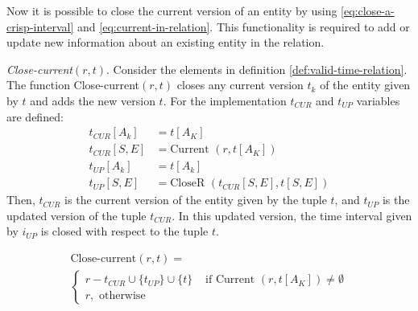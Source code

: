 Now it is possible to close the current version of an entity by using \eqref{eq:close-a-crisp-interval} and \eqref{eq:current-in-relation}. This functionality is required to add or update new information about an existing entity in the relation.

\begin{definition}
\label{def:close-current-version}
\emph{Close-current$\left(r, t\right)$}.
Consider the elements in definition \ref{def:valid-time-relation}. The function Close-current$\left(r, t \right)$ closes any current version $t_k$ of the entity given by $t$ and adds the new version $t$. For the implementation $t_{CUR}$ and $t_{UP}$ variables are defined:
\begin{align}
 \label{eq:variables-current-version}
t_{CUR}\left[A_k\right] &= t[A_K]\\\nonumber
t_{CUR}\left[S,E \right] &= \mbox{Current } \left(r, t[A_K] \right)\\\nonumber
t_{UP}[A_k] &= t[A_k]\\
 t_{UP}\left[S,E \right] &= \mbox{CloseR }\left(t_{CUR}\left[S,E \right], t[S,E] \right)\nonumber
\end{align}
Then, $t_{CUR}$ is the current version of the entity given by the tuple $t$, and $t_{UP}$ is the updated version of the tuple $t_{CUR}$. In this updated version, the time interval given by $i_{UP}$ is closed with respect to the tuple $t$.


\begin{eqnarray}
\label{eq:close-current}
\text{Close-current} \left(r, t \right) =\\
\begin{cases}
\nonumber
r - t_{CUR} \cup \lbrace t_{UP}\rbrace \cup \lbrace t \rbrace
& \mbox{ if } \mbox{Current } \left(r, t[A_K] \right) \neq \emptyset \\
r , \text{ otherwise}
\end{cases}
\end{eqnarray}
\end{definition}

